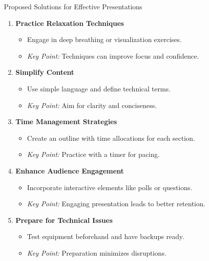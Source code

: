 \documentclass[aspectratio=169]{beamer}
\begin{document}
\begin{frame}[fragile]{Proposed Solutions for Effective Presentations}
    \begin{enumerate}
        \item \textbf{Practice Relaxation Techniques}
            \begin{itemize}
                \item Engage in deep breathing or visualization exercises.
                \item \textit{Key Point:} Techniques can improve focus and confidence.
            \end{itemize}
        
        \item \textbf{Simplify Content}
            \begin{itemize}
                \item Use simple language and define technical terms.
                \item \textit{Key Point:} Aim for clarity and conciseness.
            \end{itemize}
        
        \item \textbf{Time Management Strategies}
            \begin{itemize}
                \item Create an outline with time allocations for each section.
                \item \textit{Key Point:} Practice with a timer for pacing.
            \end{itemize}
        
        \item \textbf{Enhance Audience Engagement}
            \begin{itemize}
                \item Incorporate interactive elements like polls or questions.
                \item \textit{Key Point:} Engaging presentation leads to better retention.
            \end{itemize}

        \item \textbf{Prepare for Technical Issues}
            \begin{itemize}
                \item Test equipment beforehand and have backups ready.
                \item \textit{Key Point:} Preparation minimizes disruptions.
            \end{itemize}
    \end{enumerate}
\end{frame}
\end{document}
